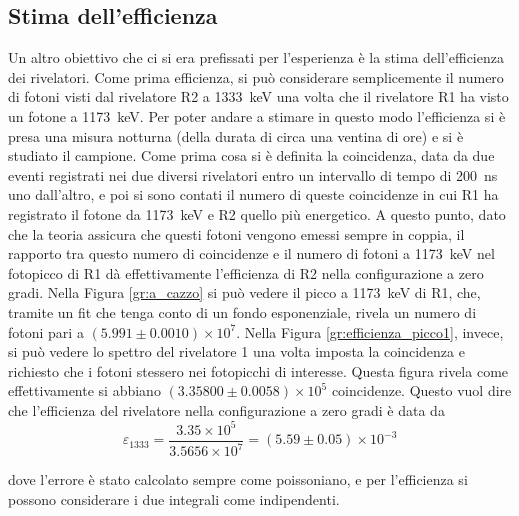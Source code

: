 \subsection{Stima dell'efficienza}
Un altro obiettivo che ci si era prefissati per l'esperienza è la stima dell'efficienza dei rivelatori. Come prima efficienza, si può considerare semplicemente il numero
di fotoni visti dal rivelatore R2 a 1333~keV una volta che il rivelatore R1 ha visto un fotone a 1173~keV. Per poter andare a stimare in questo modo l'efficienza si è presa
una misura notturna (della durata di circa una ventina di ore) e si è studiato il campione. Come prima cosa si è definita la coincidenza, data da due eventi
registrati nei due diversi rivelatori entro un intervallo di tempo di 200~ns uno dall'altro, e poi si sono contati il numero di queste coincidenze in cui R1 ha registrato
il fotone da 1173~keV e R2 quello più energetico. A questo punto, dato che la teoria assicura che questi fotoni vengono emessi sempre in coppia, il rapporto tra questo
numero di coincidenze e il numero di fotoni a 1173~keV nel fotopicco di R1 dà effettivamente l'efficienza di R2 nella configurazione a zero gradi. Nella
Figura \ref{gr:a_cazzo} si può vedere il picco a 1173~keV di R1, che, tramite un fit che tenga conto di un fondo esponenziale, rivela un numero
di fotoni pari a $(5.991 \pm 0.0010)\times 10^7$.
Nella Figura \ref{gr:efficienza_picco1}, invece, si può vedere lo spettro del rivelatore 1 una volta imposta la coincidenza e richiesto che i fotoni stessero
nei fotopicchi di interesse. Questa figura rivela come effettivamente si abbiano $(3.35800 \pm 0.0058)\times 10^5$ coincidenze. Questo vuol dire che l'efficienza del 
rivelatore nella configurazione
a zero gradi è data da
$$\varepsilon_{1333}=\frac{3.35\times 10^5}{3.5656 \times 10^7}=(5.59 \pm 0.05)\times 10^{-3}$$

%

dove l'errore è stato calcolato sempre come poissoniano, e per l'efficienza si possono considerare i due integrali come indipendenti.\\

